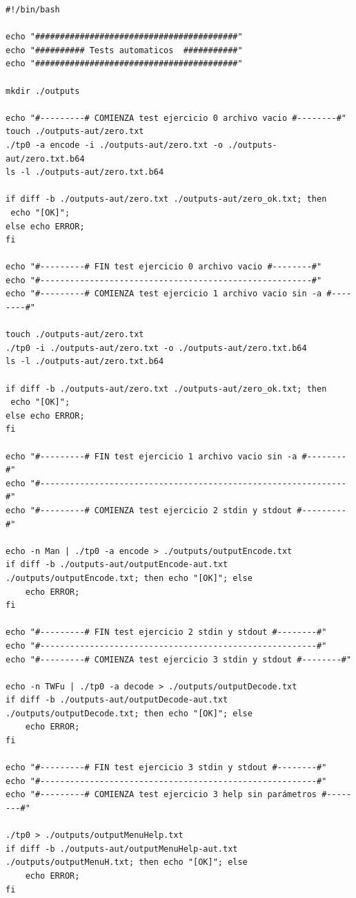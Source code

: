 \documentclass[10pt,a4paper]{article}
\begin{document}
\begin{lstlisting}
#!/bin/bash

echo "#########################################"
echo "########## Tests automaticos  ###########"
echo "#########################################"

mkdir ./outputs

echo "#---------# COMIENZA test ejercicio 0 archivo vacio #--------#"
touch ./outputs-aut/zero.txt
./tp0 -a encode -i ./outputs-aut/zero.txt -o ./outputs-aut/zero.txt.b64
ls -l ./outputs-aut/zero.txt.b64

if diff -b ./outputs-aut/zero.txt ./outputs-aut/zero_ok.txt; then
 echo "[OK]";
else echo ERROR;
fi

echo "#---------# FIN test ejercicio 0 archivo vacio #--------#"
echo "#-------------------------------------------------------#"
echo "#---------# COMIENZA test ejercicio 1 archivo vacio sin -a #--------#"

touch ./outputs-aut/zero.txt
./tp0 -i ./outputs-aut/zero.txt -o ./outputs-aut/zero.txt.b64
ls -l ./outputs-aut/zero.txt.b64

if diff -b ./outputs-aut/zero.txt ./outputs-aut/zero_ok.txt; then
 echo "[OK]";
else echo ERROR;
fi

echo "#---------# FIN test ejercicio 1 archivo vacio sin -a #--------#"
echo "#--------------------------------------------------------------#"
echo "#---------# COMIENZA test ejercicio 2 stdin y stdout #---------#"

echo -n Man | ./tp0 -a encode > ./outputs/outputEncode.txt
if diff -b ./outputs-aut/outputEncode-aut.txt ./outputs/outputEncode.txt; then echo "[OK]"; else
	echo ERROR;
fi

echo "#---------# FIN test ejercicio 2 stdin y stdout #--------#"
echo "#--------------------------------------------------------#"
echo "#---------# COMIENZA test ejercicio 3 stdin y stdout #--------#"

echo -n TWFu | ./tp0 -a decode > ./outputs/outputDecode.txt
if diff -b ./outputs-aut/outputDecode-aut.txt ./outputs/outputDecode.txt; then echo "[OK]"; else
	echo ERROR;
fi

echo "#---------# FIN test ejercicio 3 stdin y stdout #--------#"
echo "#--------------------------------------------------------#"
echo "#---------# COMIENZA test ejercicio 3 help sin parámetros #--------#"

./tp0 > ./outputs/outputMenuHelp.txt
if diff -b ./outputs-aut/outputMenuHelp-aut.txt ./outputs/outputMenuH.txt; then echo "[OK]"; else
	echo ERROR;
fi


\end{lstlisting}
\end{document}
